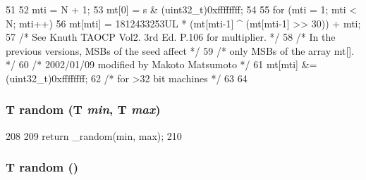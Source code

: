 \begin{DoxyCode}
51 {
52     mti = N + 1;
53     mt[0] = s & (uint32_t)0xffffffff;
54 
55     for (mti = 1; mti < N; mti++) {
56         mt[mti] = 1812433253UL * (mt[mti-1] ^ (mt[mti-1] >> 30)) + mti;
57         /* See Knuth TAOCP Vol2. 3rd Ed. P.106 for multiplier. */
58         /* In the previous versions, MSBs of the seed affect   */
59         /* only MSBs of the array mt[].                        */
60         /* 2002/01/09 modified by Makoto Matsumoto             */
61         mt[mti] &= (uint32_t)0xffffffff;
62         /* for >32 bit machines */
63     }
64 }
\end{DoxyCode}
\hypertarget{classRandom_a285d9a49e39bd2750a46101f3fdcc1e9}{
\subsubsection[{random}]{\setlength{\rightskip}{0pt plus 5cm}T random (T {\em min}, \/  T {\em max})}}
\label{classRandom_a285d9a49e39bd2750a46101f3fdcc1e9}



\begin{DoxyCode}
208     {
209         return _random(min, max);
210     }
\end{DoxyCode}
\hypertarget{classRandom_a0fd6fb9d84d010276df0648c266e563f}{
\subsubsection[{random}]{\setlength{\rightskip}{0pt plus 5cm}T random ()}}
\label{classRandom_a0fd6fb9d84d010276df0648c266e563f}



